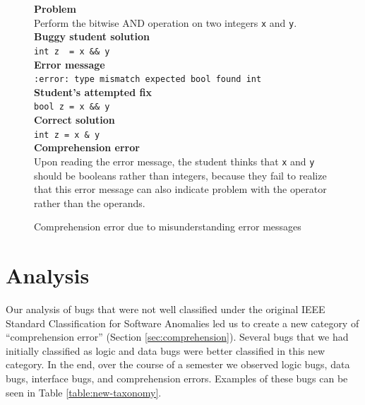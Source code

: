 \documentclass{sig-alternate}
\begin{document}
\begin{figure}
\begin{framed}
\setlength{\parindent}{0cm}
\textbf{Problem} \\
Perform the bitwise AND operation on two integers \texttt{x} and \texttt{y}.\\

\textbf{Buggy student solution} \\
\verb|int z  = x && y|\\

\textbf{Error message}\\
\texttt{:error: type mismatch expected bool found int}\\

\textbf{Student's attempted fix}\\
\verb|bool z = x && y|\\

\textbf{Correct solution}\\
\verb|int z = x & y|\\

\textbf{Comprehension error}\\
Upon reading the error message, the student thinks that \texttt{x} and \texttt{y} should be booleans rather than integers, because they fail to realize that this error message can also indicate problem with the operator rather than the operands.
\end{framed}
\caption{Comprehension error due to misunderstanding error messages}
\label{fig:comp3}
\end{figure}


\section{Analysis}
\label{sec:analysis}

Our analysis of bugs that were not well classified under the original IEEE Standard Classification for Software Anomalies led us to create a new category of ``comprehension error'' (Section \ref{sec:comprehension}). Several bugs that we had initially classified as logic and data bugs were better classified in this new category. In the end, over the course of a semester we observed \numlogic logic bugs, \numdata data bugs, \numinterface interface bugs, and \numcomp comprehension errors. Examples of these bugs can be seen in Table \ref{table:new-taxonomy}.\\
\end{document}
